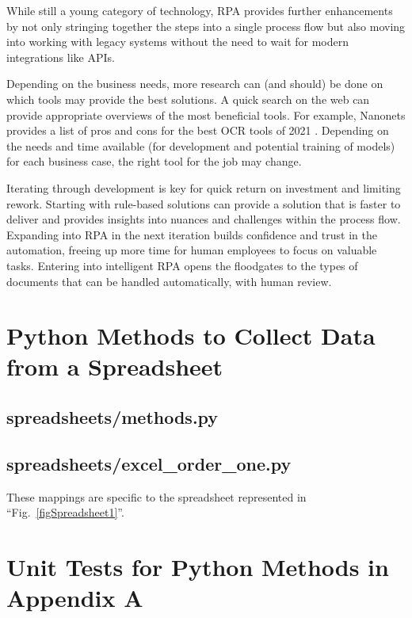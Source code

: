 \documentclass[conference, draftcls]{IEEEtran}
\begin{document}
While still a young category of technology, RPA provides further enhancements by not only stringing together the steps into a single process flow but also moving into working with legacy systems without the need to wait for modern integrations like APIs.

Depending on the business needs, more research can (and should) be done on which tools may provide the best solutions. A quick search on the web can provide appropriate overviews of the most beneficial tools. For example, Nanonets provides a list of pros and cons for the best OCR tools of 2021 \cite{prithiv2021best}. Depending on the needs and time available (for development and potential training of models) for each business case, the right tool for the job may change.

Iterating through development is key for quick return on investment and limiting rework. Starting with rule-based solutions can provide a solution that is faster to deliver and provides insights into nuances and challenges within the process flow. Expanding into RPA in the next iteration builds confidence and trust in the automation, freeing up more time for human employees to focus on valuable tasks. Entering into intelligent RPA opens the floodgates to the types of documents that can be handled automatically, with human review.




\onecolumn
\appendices

\newpage
\section{Python Methods to Collect Data from a Spreadsheet} \label{appendixOrderOne}
    \subsection{spreadsheets/methods.py}
    

    \subsection{spreadsheets/excel\_order\_one.py}
    These mappings are specific to the spreadsheet represented in ``Fig.~\ref{figSpreadsheet1}''.
    

\newpage
\section{Unit Tests for Python Methods in Appendix A} \label{appendixOrderOneTests}
\end{document}
